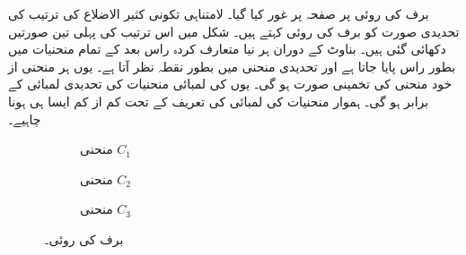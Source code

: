 برف کی روئی پر صفحہ  پر غور کیا گیا۔ لامتناہی تکونی کثیر الاضلاع کی ترتیب  کی تحدیدی صورت کو برف کی روئی  کہتے ہیں۔  شکل  میں اس ترتیب کی پہلی تین صورتیں دکھائی گئی ہیں۔ بناوٹ کے دوران ہر نیا متعارف کردہ راس بعد کے تمام منحنیات میں بطور راس پایا جاتا ہے اور تحدیدی منحنی  میں بطور نقطہ نظر آتا ہے۔ یوں ہر منحنی   از خود منحنی  کی تخمینی صورت ہو گی۔ یوں  کی لمبائی منحنیات  کی تحدیدی لمبائی کے برابر ہو گی۔ ہموار منحنیات کی لمبائی کی تعریف کے تحت کم از کم ایسا ہی ہونا چاہیے۔ 
\begin{figure}
\centering
\begin{subfigure}{0.22\textwidth}
\centering
{}
\caption{منحنی $C_1$}
\end{subfigure}\hfill
\begin{subfigure}{0.22\textwidth}
\centering
{}
\caption{منحنی $C_2$}
\end{subfigure}\hfill
\begin{subfigure}{0.22\textwidth}
\centering
{}
\caption{منحنی $C_3$}
\end{subfigure}
\caption{برف کی روئی۔}
\label{شکل_تکمل_استعمال_روئی_برف}
\end{figure}

